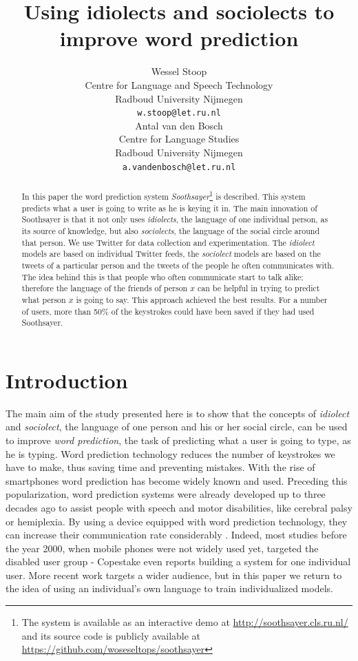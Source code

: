 \documentclass[11pt]{article}
\title{Using idiolects and sociolects to improve word prediction}
\author{Wessel Stoop \\
   Centre for Language and Speech Technology\\
  Radboud University Nijmegen \\
  {\tt w.stoop@let.ru.nl} \\\And
  Antal van den Bosch \\
  Centre for Language Studies \\
  Radboud University Nijmegen \\
  {\tt a.vandenbosch@let.ru.nl} \\}
\date{}
\begin{document}
\maketitle

\begin{abstract}
In this paper the word prediction system \emph{Soothsayer}\footnote{The system is available as an interactive demo at \url{http://soothsayer.cls.ru.nl/} and its source code is publicly available at \url{https://github.com/woseseltops/soothsayer}} is described. This system predicts what a user is going to write as he is keying it in. The main innovation of Soothsayer is that it not only uses \emph{idiolects}, the language of one individual person, as its source of knowledge, but also \emph{sociolects}, the language of the social circle around that person. We use Twitter for data collection and experimentation. The \emph{idiolect} models are based on individual Twitter feeds, the \emph{sociolect} models are based on the tweets of a particular person and the tweets of the people he often communicates with. The idea behind this is that people who often communicate start to talk alike; therefore the language of the friends of person $x$ can be helpful in trying to predict what person $x$ is going to say. This approach achieved the best results. For a number of users, more than 50\% of the keystrokes could have been saved if they had used Soothsayer. 
\end{abstract}

\section{Introduction} \label{intro}

The main aim of the study presented here is to show that the concepts of \emph{idiolect} and \emph{sociolect}, the language of one person and his or her social circle, can be used to improve \emph{word prediction}, the task of predicting what a user is going to type, as he is typing. Word prediction technology reduces the number of keystrokes we have to make, thus saving time and preventing mistakes. With the rise of smartphones word prediction has become widely known and used. Preceding this popularization, word prediction systems were already developed up to three decades ago to assist people with speech and motor disabilities, like cerebral palsy or hemiplexia. By using a device equipped with word prediction technology, they can increase their communication rate considerably \cite{Garay-Vitoria+06}. Indeed, most studies before the year 2000, when mobile phones were not widely used yet, targeted the disabled user group - Copestake  even reports building a system for one individual user. More recent work targets a wider audience, but in this paper we return to the idea of using an individual's own language to train individualized models.
\end{document}
